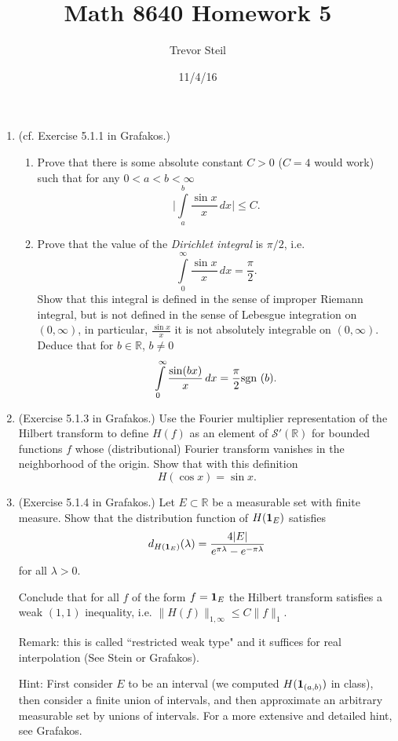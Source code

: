 \documentclass[a4paper]{article}
\title{Math 8640 Homework 5 }
\date{11/4/16}
\author{Trevor Steil}
\begin{document}
\maketitle

\begin{enumerate}
\item (cf. Exercise 5.1.1 in Grafakos.)
\begin{enumerate}
\item Prove that there is some absolute constant $C>0$ ($C=4$ would work) such that  for any $0<a<b<\infty$
$$ \bigg| \int\limits_a^b \frac{\sin x}{x} \, dx \bigg| \le C.$$
\item Prove that the value of the {\it{Dirichlet integral}} is $\pi/2$, i.e. $$  \int\limits_0^\infty \frac{\sin x}{x} \, dx = \frac{\pi}2.$$
Show that this integral is defined in the sense of improper Riemann integral, but is not defined in the sense of Lebesgue integration on $(0,\infty)$, in particular, $\frac{\sin{x}}{x}$ it is not absolutely integrable on $(0,\infty)$.
Deduce that  for $b\in \mathbb R$, $b\neq 0$ $$  \int\limits_0^\infty \frac{\sin (bx)}{x} \, dx = \frac{\pi}2 \textup{sgn } (b).$$
\end{enumerate}
\item (Exercise 5.1.3 in Grafakos.) Use the Fourier multiplier representation of the Hilbert transform to define $H(f)$ as an element of $\mathcal S' (\mathbb R)$ for bounded functions $f$ whose  (distributional) Fourier transform vanishes in the neighborhood of the origin. Show that with this definition $$ H (\cos x) = \sin x.$$

\item (Exercise 5.1.4 in Grafakos.)  Let $E \subset \mathbb R$ be a measurable set with finite measure. Show that the distribution function of $H ({\bf{1}}_E)$ satisfies $$ d_{H ({\bf{1}}_E)} (\lambda)  = \frac{ 4|E| }{ e^{\pi \lambda}  - e^{-\pi \lambda}}$$ for all $\lambda >0$.

Conclude that for all $f$ of the form $f = {\bf{1}}_E$  the Hilbert transform satisfies a weak $(1,1)$ inequality, i.e. $\| H (f) \|_{1,\infty} \le C \| f \|_1$.

Remark: this is called ``restricted weak type" and it suffices for real interpolation (See Stein or Grafakos).

Hint: First consider $E$ to be an interval (we computed $H( {\bf{1}}_{(a,b)})$ in class), then consider a finite union of intervals, and then approximate an arbitrary measurable set by unions of intervals. For a more extensive and detailed hint, see Grafakos.


\end{enumerate}
\end{document}
